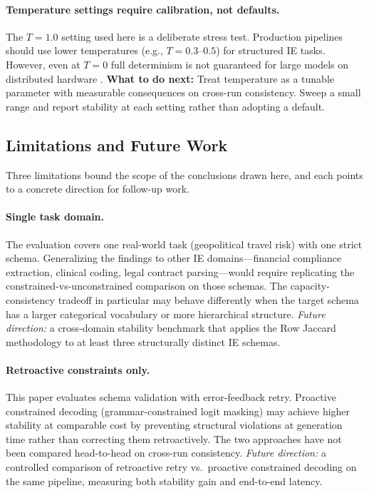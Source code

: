 \documentclass[sigconf]{acmart}
\begin{document}
\paragraph{Temperature settings require calibration, not defaults.}
The $T{=}1.0$ setting used here is a deliberate stress test. Production pipelines should use lower temperatures (e.g., $T{=}0.3$--$0.5$) for structured IE tasks. However, even at $T{=}0$ full determinism is not guaranteed for large models on distributed hardware \cite{atil2024nondeterminism, yuan2025numerical}.
\textbf{What to do next:} Treat temperature as a tunable parameter with measurable consequences on cross-run consistency. Sweep a small range and report stability at each setting rather than adopting a default.

\subsection{Limitations and Future Work}

Three limitations bound the scope of the conclusions drawn here, and each points to a concrete direction for follow-up work.

\paragraph{Single task domain.} The evaluation covers one real-world task (geopolitical travel risk) with one strict schema. Generalizing the findings to other IE domains---financial compliance extraction, clinical coding, legal contract parsing---would require replicating the constrained-vs-unconstrained comparison on those schemas. The capacity-consistency tradeoff in particular may behave differently when the target schema has a larger categorical vocabulary or more hierarchical structure. \emph{Future direction:} a cross-domain stability benchmark that applies the Row Jaccard methodology to at least three structurally distinct IE schemas.

\paragraph{Retroactive constraints only.} This paper evaluates schema validation with error-feedback retry. Proactive constrained decoding (grammar-constrained logit masking) may achieve higher stability at comparable cost by preventing structural violations at generation time rather than correcting them retroactively. The two approaches have not been compared head-to-head on cross-run consistency. \emph{Future direction:} a controlled comparison of retroactive retry vs.\ proactive constrained decoding on the same pipeline, measuring both stability gain and end-to-end latency.
\end{document}
